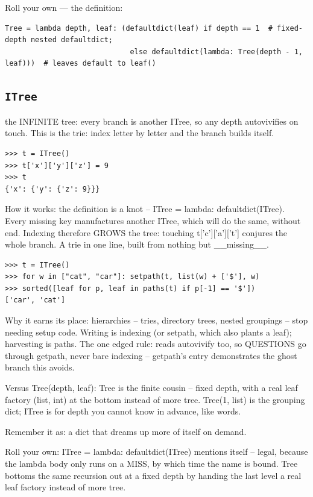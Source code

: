 \documentclass[10pt,letterpaper]{book}
\begin{document}
Roll your own --- the definition:

\begin{lstlisting}[style=ex]
Tree = lambda depth, leaf: (defaultdict(leaf) if depth == 1  # fixed-depth nested defaultdict;
                             else defaultdict(lambda: Tree(depth - 1, leaf)))  # leaves default to leaf()
\end{lstlisting}

\subsection{\texttt{ITree}}\label{def:ITree}
the INFINITE tree: every branch is another ITree, so any depth autovivifies on touch. This is the trie: index letter by letter and the branch builds itself.
\begin{lstlisting}[style=ex]
>>> t = ITree()
>>> t['x']['y']['z'] = 9
>>> t
{'x': {'y': {'z': 9}}}
\end{lstlisting}

How it works: the definition is a knot -- ITree = lambda: defaultdict(ITree). Every missing key manufactures another ITree, which will do the same, without end. Indexing therefore GROWS the tree: touching t['c']['a']['t'] conjures the whole branch. A trie in one line, built from nothing but \_\_missing\_\_.

\begin{lstlisting}[style=ex]
>>> t = ITree()
>>> for w in ["cat", "car"]: setpath(t, list(w) + ['$'], w)
>>> sorted([leaf for p, leaf in paths(t) if p[-1] == '$'])
['car', 'cat']
\end{lstlisting}

Why it earns its place: hierarchies -- tries, directory trees, nested groupings -- stop needing setup code. Writing is indexing (or setpath, which also plants a leaf); harvesting is paths. The one edged rule: reads autovivify too, so QUESTIONS go through getpath, never bare indexing -- getpath's entry demonstrates the ghost branch this avoids.


Versus Tree(depth, leaf): Tree is the finite cousin -- fixed depth, with a real leaf factory (list, int) at the bottom instead of more tree. Tree(1, list) is the grouping dict; ITree is for depth you cannot know in advance, like words.


Remember it as: a dict that dreams up more of itself on demand.


Roll your own: ITree = lambda: defaultdict(ITree) mentions itself -- legal, because the lambda body only runs on a MISS, by which time the name is bound. Tree bottoms the same recursion out at a fixed depth by handing the last level a real leaf factory instead of more tree.
\end{document}
